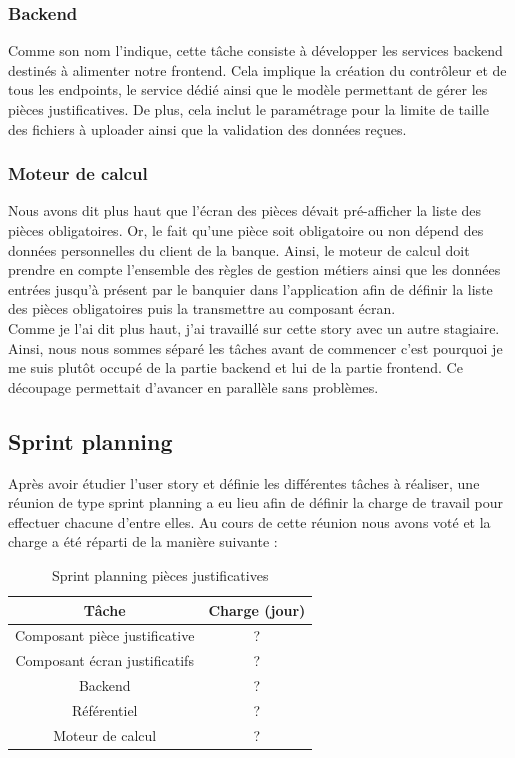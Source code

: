 	\subsubsection{Backend}
	Comme son nom l'indique, cette tâche consiste à développer les services backend destinés à alimenter notre frontend. Cela implique la création du contrôleur et de tous les endpoints, le service dédié ainsi que le modèle permettant de gérer les pièces justificatives. De plus, cela inclut le paramétrage pour la limite de taille des fichiers à uploader ainsi que la validation des données reçues.
	
	\subsubsection{Moteur de calcul}
	Nous avons dit plus haut que l'écran des pièces dévait pré-afficher la liste des pièces obligatoires. Or, le fait qu'une pièce soit obligatoire ou non dépend des données personnelles du client de la banque. Ainsi, le moteur de calcul doit prendre en compte l'ensemble des règles de gestion métiers ainsi que les données entrées jusqu'à présent par le banquier dans l'application afin de définir la liste des pièces obligatoires puis la transmettre au composant écran. \\
	
	Comme je l'ai dit plus haut, j'ai travaillé sur cette story avec un autre stagiaire. Ainsi, nous nous sommes séparé les tâches avant de commencer c'est pourquoi je me suis plutôt occupé de la partie backend et lui de la partie frontend. Ce découpage permettait d'avancer en parallèle sans problèmes. \\
	
\subsection{Sprint planning}
	Après avoir étudier l'user story et définie les différentes tâches à réaliser, une réunion de type sprint planning a eu lieu afin de définir la charge de travail pour effectuer chacune d'entre elles. Au cours de cette réunion nous avons voté et la charge a été réparti de la manière suivante :
	
\begin{table}[h!]
	\center
	\begin{tabular}{| c | c |}
     \hline
     Tâche & Charge (jour) \\ \hline
     Composant pièce justificative & ?\\ \hline
     Composant écran justificatifs & ?\\ \hline
     Backend & ?\\ \hline
     Référentiel & ?\\ \hline
     Moteur de calcul & ?\\
     \hline
	\end{tabular}
	\caption{Sprint planning pièces justificatives}
	\label{sprintPlanningPJ}
\end{table}

